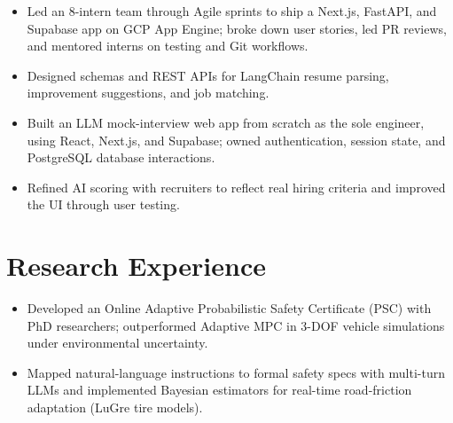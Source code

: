 \documentclass[11pt, letterpaper]{article}
\begin{document}
\begin{itemize}
  \item Led an 8-intern team through Agile sprints to ship a Next.js, FastAPI, and Supabase app on GCP App Engine; broke down user stories, led PR reviews, and mentored interns on testing and Git workflows.
  \item Designed schemas and REST APIs for LangChain resume parsing, improvement suggestions, and job matching.
\end{itemize}

\begin{itemize}
  \item Built an LLM mock-interview web app from scratch as the sole engineer, using React, Next.js, and Supabase; owned authentication, session state, and PostgreSQL database interactions.
  \item Refined AI scoring with recruiters to reflect real hiring criteria and improved the UI through user testing.
\end{itemize}

\section{Research Experience}
\begin{itemize}
  \item Developed an Online Adaptive Probabilistic Safety Certificate (PSC) with PhD researchers; outperformed Adaptive MPC in 3-DOF vehicle simulations under environmental uncertainty.
  \item Mapped natural-language instructions to formal safety specs with multi-turn LLMs and implemented Bayesian estimators for real-time road-friction adaptation (LuGre tire models).
\end{itemize}
\end{document}
